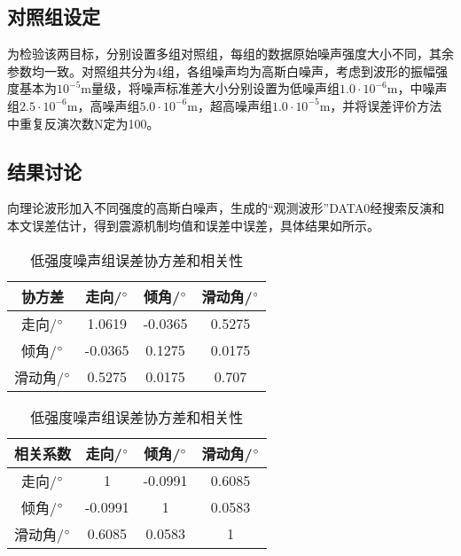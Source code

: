 \subsection{对照组设定}
为检验该两目标，分别设置多组对照组，每组的数据原始噪声强度大小不同，其余参数均一致。对照组共分为4组，各组噪声均为高斯白噪声，考虑到波形的振幅强度基本为$10^{-5}$m量级，将噪声标准差大小分别设置为低噪声组$1.0\cdot10^{-6}$m，中噪声组$2.5\cdot10^{-6}$m，高噪声组$5.0\cdot10^{-6}$m，超高噪声组$1.0\cdot10^{-5}$m，并将误差评价方法中重复反演次数N定为100。

\subsection{结果讨论}
向理论波形加入不同强度的高斯白噪声，生成的“观测波形”DATA0经搜索反演和本文误差估计，得到震源机制均值和误差中误差，具体结果如所示。
\begin{table}[ht]
\centering
\caption{低强度噪声组误差协方差和相关性}
\label{tab3_02}
    \begin{tabular}{c c c c}
    \hline
    协方差 & 走向/$^\circ$ & 倾角/$^\circ$ & 滑动角/$^\circ$ \\
    \hline
	走向/$^\circ$ 		&1.0619 	&-0.0365	&0.5275\\
	倾角/$^\circ$		&-0.0365	&0.1275		&0.0175\\
	滑动角/$^\circ$	&0.5275		&0.0175		&0.707\\
    \hline
    \end{tabular}
    \begin{tabular}{c c c c}
    \hline
    相关系数 & 走向/$^\circ$ & 倾角/$^\circ$ & 滑动角/$^\circ$ \\
    \hline
	走向/$^\circ$ 		&1 			&-0.0991	&0.6085\\
	倾角/$^\circ$		&-0.0991	&1			&0.0583\\
	滑动角/$^\circ$	&0.6085		&0.0583		&1\\
    \hline
    \end{tabular}
\end{table}

